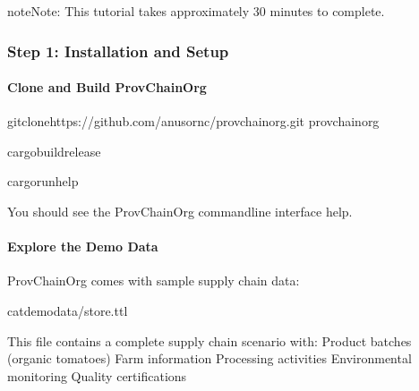 \documentclass[letterpaper,10pt,english]{sphinxmanual}
\begin{document}
\begin{sphinxadmonition}{note}{Note:}
\sphinxAtStartPar
This tutorial takes approximately 30 minutes to complete.
\end{sphinxadmonition}


\subsubsection{Step 1: Installation and Setup}
\label{\detokenize{tutorials/first-supply-chain:step-1-installation-and-setup}}

\paragraph{Clone and Build ProvChainOrg}
\label{\detokenize{tutorials/first-supply-chain:clone-and-build-provchainorg}}
\begin{sphinxVerbatim}[commandchars=\\\{\}]
gitclonehttps://github.com/anusornc/provchain\PYGZhy{}org.git
provchain\PYGZhy{}org

cargobuild\PYGZhy{}\PYGZhy{}release

cargorun\PYGZhy{}\PYGZhy{}\PYGZhy{}\PYGZhy{}help
\end{sphinxVerbatim}

\sphinxAtStartPar
You should see the ProvChainOrg command\sphinxhyphen{}line interface help.


\paragraph{Explore the Demo Data}
\label{\detokenize{tutorials/first-supply-chain:explore-the-demo-data}}
\sphinxAtStartPar
ProvChainOrg comes with sample supply chain data:

\begin{sphinxVerbatim}[commandchars=\\\{\}]
catdemo\PYGZus{}data/store.ttl
\end{sphinxVerbatim}

\sphinxAtStartPar
This file contains a complete supply chain scenario with:
\sphinxhyphen{} Product batches (organic tomatoes)
\sphinxhyphen{} Farm information
\sphinxhyphen{} Processing activities
\sphinxhyphen{} Environmental monitoring
\sphinxhyphen{} Quality certifications
\end{document}
